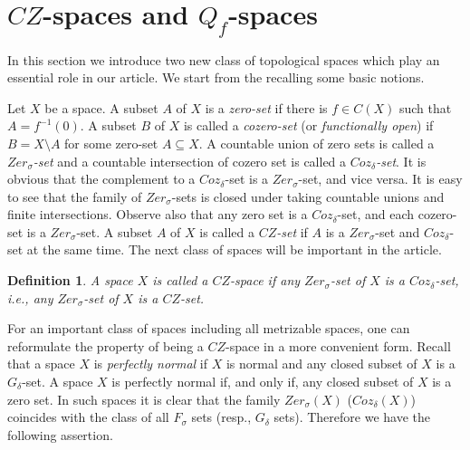 \documentclass[preprint,11pt]{elsarticle}
\newtheorem{definition}[theorem]{Definition}
\numberwithin{equation}{section}
\numberwithin{theorem}{section}
\newcommand{\SM}{{\setminus}}
\begin{document}

\section{$CZ$-spaces and $Q_f$-spaces} \label{sec:CZ}


In this section we introduce two new class of topological spaces which play an essential role in our article. We start from the recalling some basic notions.


Let $X$ be a space. A subset $A$ of $X$ is a {\em zero-set} if there is $f\in C(X)$ such that $A=f^{-1}(0)$. A subset $B$ of $X$ is called a {\em cozero-set} (or {\em functionally open}) if $B=X\SM A$ for some zero-set $A\subseteq X$.
A countable union of zero sets is called a {\em $Zer_{\sigma}$-set} and a countable intersection of cozero set is called a {\em $Coz_{\delta}$-set}.
It is obvious that the complement to a $Coz_{\delta}$-set is a $Zer_{\sigma}$-set, and vice versa.  It is easy to see that the family of $Zer_{\sigma}$-sets is closed under taking countable unions and finite intersections.
Observe also that any zero set is a $Coz_{\delta}$-set, and each cozero-set is a $Zer_{\sigma}$-set.
A subset $A$ of $X$ is called a {\em $CZ$-set} if $A$ is a $Zer_{\sigma}$-set and $Coz_{\delta}$-set at the same time.
The next class of spaces will be important in the article.

\begin{definition} \label{def:CZ-space} {\em
A space $X$ is called a {\em $CZ$-space}  if any $Zer_{\sigma}$-set of $X$ is a $Coz_{\delta}$-set, i.e.,
any $Zer_{\sigma}$-set of $X$ is a $CZ$-set.}
\end{definition}


For an important class of spaces including all metrizable spaces, one can reformulate the property of being a $CZ$-space in a more convenient form. Recall that a space $X$ is  {\em perfectly normal} if $X$ is normal and any closed subset of $X$ is a $G_\delta$-set. A space $X$ is perfectly normal if, and only if, any closed subset of $X$ is a zero set. In such spaces it is clear that the family $Zer_\sigma(X)$ ($Coz_\delta(X)$) coincides with the class of all $F_{\sigma}$ sets (resp., $G_{\delta}$ sets). Therefore we have the following assertion.
\end{document}
